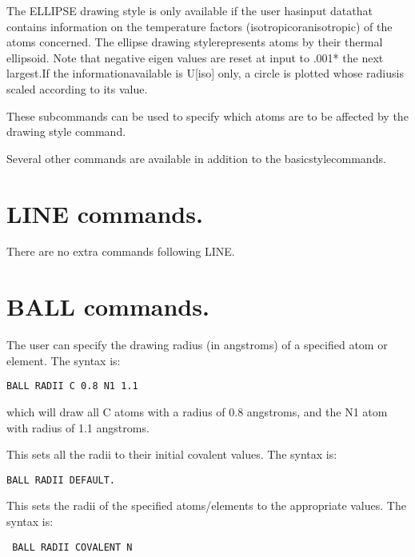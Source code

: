 \documentclass[10pt,a4paper]{report}
\begin{document}
The ELLIPSE drawing style is only available if the user hasinput datathat contains information on the temperature factors (isotropicoranisotropic) of the atoms concerned. The ellipse drawing stylerepresents atoms by their thermal ellipsoid. Note that negative eigen values are reset at input to .001* the next largest.If the informationavailable is U[iso] only, a circle is plotted whose radiusis scaled according to its value. 

\bigskip{}



\bigskip{}



\bigskip{}



These subcommands can be used to specify which atoms are to be affected by the drawing style command.

Several other commands are available in addition to the basicstylecommands.\section{LINE commands.}


There are no extra commands following LINE.
\section{BALL commands.}


\bigskip{}
The user can specify the drawing radius (in angstroms) of a
specified
atom or element. The syntax is:
\small\begin{verbatim}
BALL RADII C 0.8 N1 1.1
\end{verbatim}\normalsize


which will draw all C atoms with a radius of 0.8 angstroms, and
the N1
atom with radius of 1.1 angstroms. 


\bigskip{}
This sets all the radii to their initial covalent values.
The syntax is:
\small\begin{verbatim}
BALL RADII DEFAULT.
\end{verbatim}\normalsize




\bigskip{}


\bigskip{}


\bigskip{}
This sets the radii of the specified atoms/elements to the appropriate 
values. The syntax is:
\small\begin{verbatim} BALL RADII COVALENT N
\end{verbatim}\normalsize
\end{document}
